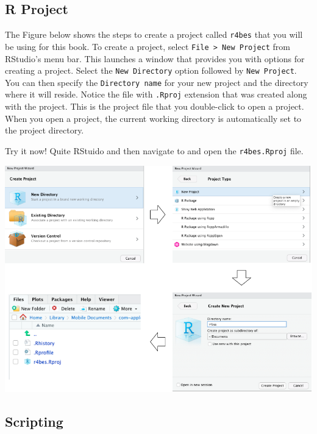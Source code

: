 \documentclass[
]{book}
\begin{document}
\hypertarget{r-project}{%
\subsection*{R Project}\label{r-project}}

The Figure below shows the steps to create a project called \texttt{r4bes} that you will be using for this book. To create a project, select \texttt{File\ \textgreater{}\ New\ Project} from RStudio's menu bar. This launches a window that provides you with options for creating a project. Select the \texttt{New\ Directory} option followed by \texttt{New\ Project}. You can then specify the \texttt{Directory\ name} for your new project and the directory where it will reside. Notice the file with \texttt{.Rproj} extension that was created along with the project. This is the project file that you double-click to open a project. When you open a project, the current working directory is automatically set to the project directory.

Try it now! Quite RStuido and then navigate to and open the \texttt{r4bes.Rproj} file.

\begin{center}\includegraphics[width=1\linewidth]{figures/create_project} \end{center}

\hypertarget{scripting}{%
\subsection*{Scripting}\label{scripting}}
\end{document}
